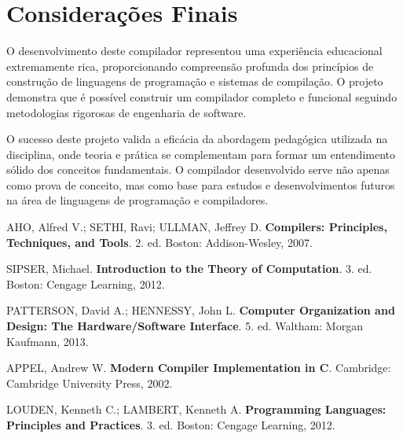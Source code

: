 \documentclass[
	12pt,				%
	oneside,
	a4paper,			%
	english,			%
	french,				%
	spanish,			%
	brazil,				%
	]{abntex2}
\begin{document}
\section{Considerações Finais}

O desenvolvimento deste compilador representou uma experiência educacional extremamente rica, proporcionando compreensão profunda dos princípios de construção de linguagens de programação e sistemas de compilação. O projeto demonstra que é possível construir um compilador completo e funcional seguindo metodologias rigorosas de engenharia de software.

O sucesso deste projeto valida a eficácia da abordagem pedagógica utilizada na disciplina, onde teoria e prática se complementam para formar um entendimento sólido dos conceitos fundamentais. O compilador desenvolvido serve não apenas como prova de conceito, mas como base para estudos e desenvolvimentos futuros na área de linguagens de programação e compiladores.


\begin{thebibliography}{9}

AHO, Alfred V.; SETHI, Ravi; ULLMAN, Jeffrey D.
\textbf{Compilers: Principles, Techniques, and Tools}.
2. ed. Boston: Addison-Wesley, 2007.

SIPSER, Michael.
\textbf{Introduction to the Theory of Computation}.
3. ed. Boston: Cengage Learning, 2012.

PATTERSON, David A.; HENNESSY, John L.
\textbf{Computer Organization and Design: The Hardware/Software Interface}.
5. ed. Waltham: Morgan Kaufmann, 2013.

APPEL, Andrew W.
\textbf{Modern Compiler Implementation in C}.
Cambridge: Cambridge University Press, 2002.

LOUDEN, Kenneth C.; LAMBERT, Kenneth A.
\textbf{Programming Languages: Principles and Practices}.
3. ed. Boston: Cengage Learning, 2012.

\end{thebibliography}

\end{document}
